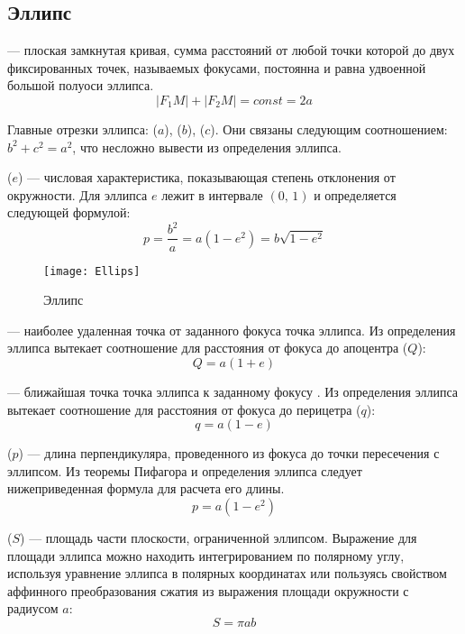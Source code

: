 \subsection{Эллипс}
{\bfseries {}} --- плоская замкнутая кривая, сумма 
расстояний от любой точки которой до двух фиксированных 
точек, называемых фокусами, постоянна и равна 
удвоенной большой полуоси эллипса.
\begin{equation}|F_1 M|+|F_2M|=const=2a
\end{equation}

Главные отрезки эллипса:  
($a$),  ($b$),  ($c$). Они связаны следующим 
соотношением: $b^2+c^2=a^2$, что несложно вывести из 
определения эллипса.

 ($e$) --- числовая 
характеристика, показывающая степень отклонения от 
окружности. Для эллипса $e$ лежит в интервале $(0, \, 1)$ и
определяется следующей формулой:\begin{equation}
p=\frac{b^2}{a}=a(1-e^2)=b\sqrt{1-e^2}
\end{equation}

\begin{figure}[h!]
\centering
\texttt{[image: Ellips]}
\caption{Эллипс}
\end{figure}

 --- наиболее удаленная точка
от заданного фокуса точка эллипса. Из определения эллипса
вытекает соотношение для расстояния от фокуса до 
апоцентра ($Q$):\begin{equation}
Q = a (1 + e)
\end{equation}

 --- ближайшая точка
точка эллипса к заданному фокусу . Из определения эллипса
вытекает соотношение для расстояния от фокуса до 
перицетра ($q$):\begin{equation}
q = a (1 - e)
\end{equation}

 ($p$) --- длина перпендикуляра,
проведенного из фокуса до точки пересечения с эллипсом.
Из теоремы Пифагора и определения эллипса следует 
нижеприведенная формула для расчета его длины. 
\begin{equation}
p = a(1 - e^2)
\end{equation}

 ($S$) --- площадь части 
плоскости, ограниченной эллипсом. Выражение для площади 
эллипса можно находить интегрированием по полярному углу, 
используя уравнение эллипса в полярных координатах или 
пользуясь свойством аффинного преобразования сжатия из 
выражения площади окружности с радиусом $a$:
\begin{equation}
S=\pi ab
\end{equation}

